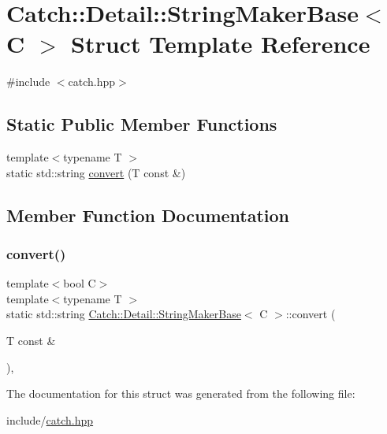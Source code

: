\hypertarget{struct_catch_1_1_detail_1_1_string_maker_base}{}\section{Catch\+:\+:Detail\+:\+:String\+Maker\+Base$<$ C $>$ Struct Template Reference}
\label{struct_catch_1_1_detail_1_1_string_maker_base}


{\ttfamily \#include $<$catch.\+hpp$>$}

\subsection*{Static Public Member Functions}
\begin{DoxyCompactItemize}
\item 
{\footnotesize template$<$typename T $>$ }\\static std\+::string \mbox{\hyperlink{struct_catch_1_1_detail_1_1_string_maker_base_a8eb9f635dc413a5758e22614bafaf1a3}{convert}} (T const \&)
\end{DoxyCompactItemize}


\subsection{Member Function Documentation}
\mbox{\label{struct_catch_1_1_detail_1_1_string_maker_base_a8eb9f635dc413a5758e22614bafaf1a3}} 
\subsubsection{\texorpdfstring{convert()}{convert()}}
{\footnotesize\ttfamily template$<$bool C$>$ \\
template$<$typename T $>$ \\
static std\+::string \mbox{\hyperlink{struct_catch_1_1_detail_1_1_string_maker_base}{Catch\+::\+Detail\+::\+String\+Maker\+Base}}$<$ C $>$\+::convert (\begin{DoxyParamCaption}\item[{T const \&}]{ }\end{DoxyParamCaption})\hspace{0.3cm}{\ttfamily [inline]}, {\ttfamily [static]}}



The documentation for this struct was generated from the following file\+:\begin{DoxyCompactItemize}
\item 
include/\mbox{\hyperlink{catch_8hpp}{catch.\+hpp}}\end{DoxyCompactItemize}
